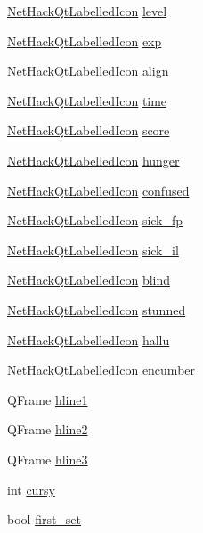 \begin{DoxyCompactItemize}
\item 
\hyperlink{classNetHackQtLabelledIcon}{Net\+Hack\+Qt\+Labelled\+Icon} \hyperlink{classNetHackQtStatusWindow_a805f49339c6cf11b278cd1c4bb81c183}{level}
\item 
\hyperlink{classNetHackQtLabelledIcon}{Net\+Hack\+Qt\+Labelled\+Icon} \hyperlink{classNetHackQtStatusWindow_ae3e53ea21f55be1ee94a1c937aeec5d8}{exp}
\item 
\hyperlink{classNetHackQtLabelledIcon}{Net\+Hack\+Qt\+Labelled\+Icon} \hyperlink{classNetHackQtStatusWindow_ae2b515da407d88bd8551c86a0247167b}{align}
\item 
\hyperlink{classNetHackQtLabelledIcon}{Net\+Hack\+Qt\+Labelled\+Icon} \hyperlink{classNetHackQtStatusWindow_ad470d0d65db02163ed57a99bcb77b325}{time}
\item 
\hyperlink{classNetHackQtLabelledIcon}{Net\+Hack\+Qt\+Labelled\+Icon} \hyperlink{classNetHackQtStatusWindow_a45ca129a889c70b0817f364aa7d291ce}{score}
\item 
\hyperlink{classNetHackQtLabelledIcon}{Net\+Hack\+Qt\+Labelled\+Icon} \hyperlink{classNetHackQtStatusWindow_ac9d3e36f2daeb99c6c65c71b3542f559}{hunger}
\item 
\hyperlink{classNetHackQtLabelledIcon}{Net\+Hack\+Qt\+Labelled\+Icon} \hyperlink{classNetHackQtStatusWindow_a7178335f65f39653cfc08e1a32ea39fa}{confused}
\item 
\hyperlink{classNetHackQtLabelledIcon}{Net\+Hack\+Qt\+Labelled\+Icon} \hyperlink{classNetHackQtStatusWindow_a1dd858a27fecfd1e40f1930cf8e40040}{sick\+\_\+fp}
\item 
\hyperlink{classNetHackQtLabelledIcon}{Net\+Hack\+Qt\+Labelled\+Icon} \hyperlink{classNetHackQtStatusWindow_a0bb58f079e109f16bcc80ba0e278864f}{sick\+\_\+il}
\item 
\hyperlink{classNetHackQtLabelledIcon}{Net\+Hack\+Qt\+Labelled\+Icon} \hyperlink{classNetHackQtStatusWindow_ab02035741f03c8c561ff6fbf3e204b47}{blind}
\item 
\hyperlink{classNetHackQtLabelledIcon}{Net\+Hack\+Qt\+Labelled\+Icon} \hyperlink{classNetHackQtStatusWindow_acd65a8affc935081e12326a9cbbfef75}{stunned}
\item 
\hyperlink{classNetHackQtLabelledIcon}{Net\+Hack\+Qt\+Labelled\+Icon} \hyperlink{classNetHackQtStatusWindow_a687de31b31a66b9aca0e5ead303e899d}{hallu}
\item 
\hyperlink{classNetHackQtLabelledIcon}{Net\+Hack\+Qt\+Labelled\+Icon} \hyperlink{classNetHackQtStatusWindow_a497a89e06f4aa1c5ba079b1f16819fff}{encumber}
\item 
Q\+Frame \hyperlink{classNetHackQtStatusWindow_a993bb3124d4a7599eb38602bd439d372}{hline1}
\item 
Q\+Frame \hyperlink{classNetHackQtStatusWindow_a6b3cafcec2bc6d2466410d013b217cbb}{hline2}
\item 
Q\+Frame \hyperlink{classNetHackQtStatusWindow_a249eb2163546a0a1072ac07871a9b965}{hline3}
\item 
int \hyperlink{classNetHackQtStatusWindow_a18d83fd16e268036f53901f4e98d0031}{cursy}
\item 
bool \hyperlink{classNetHackQtStatusWindow_a429ac66dd186b2c31df516814aee55f0}{first\+\_\+set}
\end{DoxyCompactItemize}
